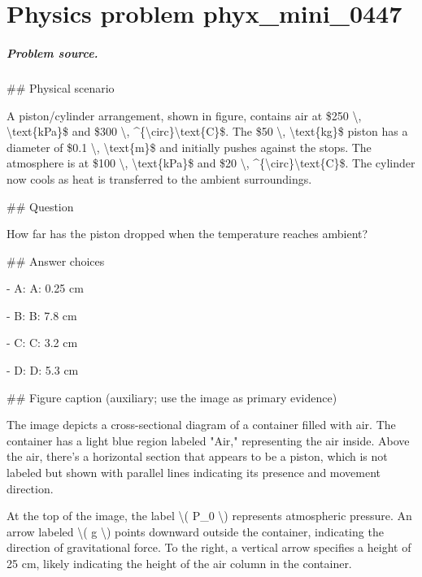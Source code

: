 
\chapter{Physics problem phyx\_mini\_0447}
\label{ch:PhyXMiniProblems_problem_phyx_mini_0447}

\paragraph{Problem source.}
\#\# Physical scenario

A piston/cylinder arrangement, shown in figure, contains air at \$250 \textbackslash{}, \textbackslash{}text\{kPa\}\$ and \$300 \textbackslash{}, \textasciicircum{}\{\textbackslash{}circ\}\textbackslash{}text\{C\}\$. The \$50 \textbackslash{}, \textbackslash{}text\{kg\}\$ piston has a diameter of \$0.1 \textbackslash{}, \textbackslash{}text\{m\}\$ and initially pushes against the stops. The atmosphere is at \$100 \textbackslash{}, \textbackslash{}text\{kPa\}\$ and \$20 \textbackslash{}, \textasciicircum{}\{\textbackslash{}circ\}\textbackslash{}text\{C\}\$. The cylinder now cools as heat is transferred to the ambient surroundings.

\#\# Question

How far has the piston dropped when the temperature reaches ambient?

\#\# Answer choices

- A: A: 0.25 cm

- B: B: 7.8 cm

- C: C: 3.2 cm

- D: D: 5.3 cm

\#\# Figure caption (auxiliary; use the image as primary evidence)

The image depicts a cross-sectional diagram of a container filled with air. The container has a light blue region labeled "Air," representing the air inside. Above the air, there's a horizontal section that appears to be a piston, which is not labeled but shown with parallel lines indicating its presence and movement direction.

At the top of the image, the label \textbackslash{}( P\_0 \textbackslash{}) represents atmospheric pressure. An arrow labeled \textbackslash{}( g \textbackslash{}) points downward outside the container, indicating the direction of gravitational force. To the right, a vertical arrow specifies a height of 25 cm, likely indicating the height of the air column in the container.

